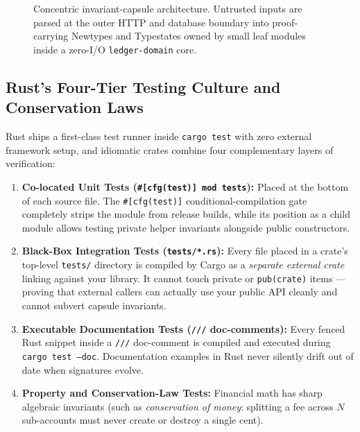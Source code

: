 \begin{figure}[H]
\caption{Concentric invariant-capsule architecture. Untrusted inputs are parsed at the outer HTTP and database boundary into proof-carrying Newtypes and Typestates owned by small leaf modules inside a zero-I/O \texttt{ledger-domain} core.}
\label{ch08:fig-invariant-capsule}
\end{figure}

\subsection{Rust's Four-Tier Testing Culture and Conservation Laws}

Rust ships a first-class test runner inside \texttt{cargo test} with zero external framework setup, and idiomatic crates combine four complementary layers of verification:

\begin{enumerate}
  \item \textbf{Co-located Unit Tests (\texttt{\#[cfg(test)] mod tests}):} Placed at the bottom of each source file. The \texttt{\#[cfg(test)]} conditional-compilation gate completely strips the module from release builds, while its position as a child module allows testing private helper invariants alongside public constructors.
  \item \textbf{Black-Box Integration Tests (\texttt{tests/*.rs}):} Every file placed in a crate's top-level \texttt{tests/} directory is compiled by Cargo as a \emph{separate external crate} linking against your library. It cannot touch private or \texttt{pub(crate)} items --- proving that external callers can actually use your public API cleanly and cannot subvert capsule invariants.
  \item \textbf{Executable Documentation Tests (\texttt{///} doc-comments):} Every fenced Rust snippet inside a \texttt{///} doc-comment is compiled and executed during \texttt{cargo test --doc}. Documentation examples in Rust never silently drift out of date when signatures evolve.
  \item \textbf{Property and Conservation-Law Tests:} Financial math has sharp algebraic invariants (such as \emph{conservation of money}: splitting a fee across $N$ sub-accounts must never create or destroy a single cent).
\end{enumerate}

